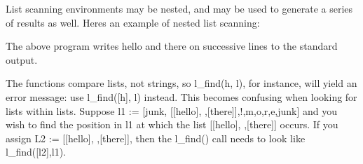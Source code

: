 List scanning environments may be nested, and may be used to generate a
series of results as well. Here{\textquotesingle}s an example of nested
list scanning:


The above program writes {\textquotedbl}hello{\textquotedbl} and
{\textquotedbl}there{\textquotedbl} on successive lines to the standard
output.

The functions compare lists, not strings, so
\textsf{l\_find({\textquotedbl}h{\textquotedbl}, l)}, for instance,
will yield an error message: use
\textsf{l\_find([{\textquotedbl}h{\textquotedbl}], l)} instead. This
becomes confusing when looking for lists within lists. Suppose
\textsf{l1 := [{\textquotedbl}junk{\textquotedbl},
[[{\textquotedbl}hello{\textquotedbl}],{\textquotedbl}
{\textquotedbl},[{\textquotedbl}there{\textquotedbl}]],{\textquotedbl}!{\textquotedbl},{\textquotedbl}m{\textquotedbl},{\textquotedbl}o{\textquotedbl},{\textquotedbl}r{\textquotedbl},{\textquotedbl}e{\textquotedbl},{\textquotedbl}junk{\textquotedbl}]}
and you wish to find the position in \textsf{l1} at which the list
\textsf{[[{\textquotedbl}hello{\textquotedbl}],{\textquotedbl}
{\textquotedbl},[{\textquotedbl}there{\textquotedbl}]]} occurs. If you
assign \textsf{L2 :=
[[{\textquotedbl}hello{\textquotedbl}],{\textquotedbl}
{\textquotedbl},[{\textquotedbl}there{\textquotedbl}]]}, then the
\textsf{l\_find()} call needs to look like \textsf{l\_find([l2],l1)}.

